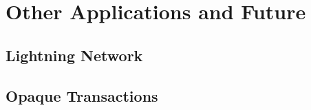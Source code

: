 \documentclass{beamer}
\begin{document}
\section{Other Applications and Future}

\subsection{Lightning Network}

\begin{frame}
\end{frame}

\subsection{Opaque Transactions}

\begin{frame}
\end{frame}
\end{document}
